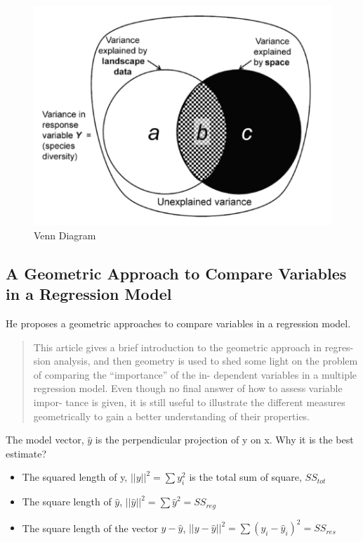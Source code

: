 \documentclass[
]{report}
\providecommand{\tightlist}{%
  \setlength{\itemsep}{0pt}\setlength{\parskip}{0pt}}
\begin{document}
\begin{figure}
    \centering
    \includegraphics[width= 250 pt]{venn.PNG}
    \caption{Venn Diagram}
\end{figure}

\hypertarget{a-geometric-approach-to-compare-variables-in-a-regression-model}{%
\subsection{A Geometric Approach to Compare Variables in a Regression Model}\label{a-geometric-approach-to-compare-variables-in-a-regression-model}}

He proposes \citep{Bring} a geometric approaches to compare variables in a regression model.

\begin{quote}
This article gives a brief introduction to the geometric approach in regres- sion analysis, and then geometry is used to shed some light on the problem of comparing the ``importance'' of the in- dependent variables in a multiple regression model. Even though no final answer of how to assess variable impor- tance is given, it is still useful to illustrate the different measures geometrically to gain a better understanding of their properties.
\end{quote}

The model vector, \(\hat{y}\) is the perpendicular projection of y on x. Why it is the best estimate?

\begin{itemize}
\tightlist
\item
  The squared length of y, \(||y||^2 = \sum y_i^2\) is the total sum of square, \(SS_{tot}\)
\item
  The square length of \(\hat{y}\), \(||\hat{y}||^2= \sum \hat{y}^2=SS_{reg}\)
\item
  The square length of the vector \(y-\hat{y}\), \(||y - \hat{y}||^2=\sum(y_i-\hat{y}_i)^2 = SS_{res}\)
\end{itemize}
\end{document}
